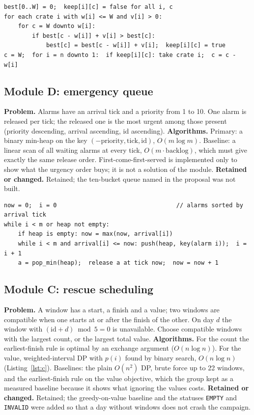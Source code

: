 \documentclass[11pt,a4paper]{article}
\newcommand{\cs}[1]{\texttt{#1}}
\begin{document}
\begin{lstlisting}[caption={Module A, DP with back-tracking (key steps).},captionpos=b,label=lst:a]
best[0..W] = 0;  keep[i][c] = false for all i, c
for each crate i with w[i] <= W and v[i] > 0:
    for c = W downto w[i]:
        if best[c - w[i]] + v[i] > best[c]:
            best[c] = best[c - w[i]] + v[i];  keep[i][c] = true
c = W;  for i = n downto 1:  if keep[i][c]: take crate i;  c = c - w[i]
\end{lstlisting}

\subsection{Module D: emergency queue}
\textbf{Problem.} Alarms have an arrival tick and a priority from 1 to 10. One alarm is released per tick; the released one is the most urgent among those present (priority descending, arrival ascending, id ascending).
\textbf{Algorithms.} Primary: a binary min-heap \cite{clrs} on the key $(-\text{priority},\text{tick},\text{id})$, $O(m\log m)$. Baseline: a linear scan of all waiting alarms at every tick, $O(m\cdot\text{backlog})$, which must give exactly the same release order.
First-come-first-served is implemented only to show what the urgency order buys; it is not a solution of the module. \textbf{Retained or changed.} Retained; the ten-bucket queue named in the proposal was not built.

\begin{lstlisting}[caption={Module D, release loop with the heap.},captionpos=b,label=lst:d]
now = 0;  i = 0                                  // alarms sorted by arrival tick
while i < m or heap not empty:
    if heap is empty: now = max(now, arrival[i])
    while i < m and arrival[i] <= now: push(heap, key(alarm i));  i = i + 1
    a = pop_min(heap);  release a at tick now;  now = now + 1
\end{lstlisting}

\subsection{Module C: rescue scheduling}
\textbf{Problem.} A window has a start, a finish and a value; two windows are compatible when one starts at or after the finish of the other. On day $d$ the window with $(\text{id}+d)\bmod 5=0$ is unavailable.
Choose compatible windows with the largest count, or the largest total value. \textbf{Algorithms.} For the count the earliest-finish rule is optimal by an exchange argument \cite{kt} ($O(n\log n)$). For the value, weighted-interval DP \cite{kt}
with $p(i)$ found by binary search, $O(n\log n)$ (Listing~\ref{lst:c}). Baselines: the plain $O(n^2)$ DP, brute force up to 22 windows, and the earliest-finish rule on the value objective, which the group kept as a measured baseline
because it shows what ignoring the values costs. \textbf{Retained or changed.} Retained; the greedy-on-value baseline and the statuses \cs{EMPTY} and \cs{INVALID} were added so that a day without windows does not crash the campaign.
\end{document}
